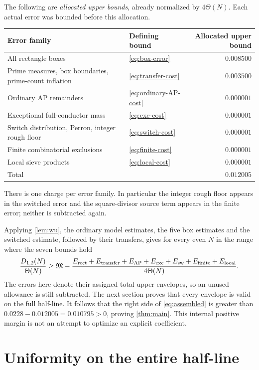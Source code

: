 \documentclass[11pt]{article}
\theoremstyle{definition}
\newcommand{\Th}{\Theta(N)}
\begin{document}
The following are \emph{allocated upper bounds}, already normalized by
$4\Th$.  Each actual error was bounded before this allocation.
\begin{center}
\begin{tabularx}{\textwidth}{@{}Xlr@{}}
\toprule
Error family & Defining bound & Allocated upper bound\\
\midrule
All rectangle boxes & \eqref{eq:box-error} & $0.008500$\\
Prime measures, box boundaries, prime-count inflation &
 \eqref{eq:transfer-cost} & $0.003500$\\
Ordinary AP remainders & \eqref{eq:ordinary-AP-cost} & $0.000001$\\
Exceptional full-conductor mass & \eqref{eq:exc-cost} & $0.000001$\\
Switch distribution, Perron, integer rough floor &
 \eqref{eq:switch-cost} & $0.000001$\\
Finite combinatorial exclusions & \eqref{eq:finite-cost} & $0.000001$\\
Local sieve products & \eqref{eq:local-cost} & $0.000001$\\
\midrule
Total & & $0.012005$\\
\bottomrule
\end{tabularx}
\end{center}
There is one charge per error family.  In particular the integer rough
floor appears in the switched error and the square-divisor source
term appears in the finite error; neither is subtracted again.

Applying \cref{lem:wu}, the ordinary model estimates, the five box
estimates and the switched estimate, followed by their transfers,
gives for every even $N$ in the range where the seven bounds hold
\begin{equation}\label{eq:assembled}
 \frac{D_{1,2}(N)}{\Th}\ge
 \mathfrak M-\frac{E_{\rm rect}+E_{\rm transfer}+E_{\rm AP}
 +E_{\rm exc}+E_{\rm sw}+E_{\rm finite}+E_{\rm local}}{4\Th}.
\end{equation}
The errors here denote their assigned total upper envelopes, so an
unused allowance is still subtracted.  The next section proves that
every envelope is valid on the full half-line.  It follows that the
right side of \eqref{eq:assembled} is greater than
$0.0228-0.012005=0.010795>0$, proving \cref{thm:main}.
This internal positive margin is not an attempt to optimize an explicit
coefficient.

\section{Uniformity on the entire half-line}\label{sec:uniform}
\end{document}
